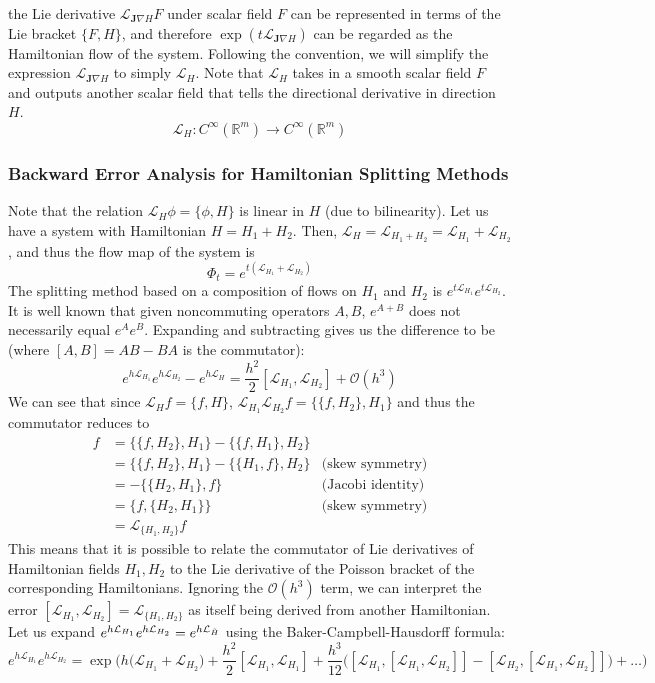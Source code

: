 \documentclass{article}
\theoremstyle{remark}
\theoremstyle{definition}
\begin{document}
the Lie derivative $\mathcal{L}_{\mathbf{J} \nabla H} F$ under scalar field $F$ can be represented in terms of the Lie bracket $\{F, H\}$, and therefore $\exp(t \mathcal{L}_{\mathbf{J} \nabla H})$ can be regarded as the Hamiltonian flow of the system. Following the convention, we will simplify the expression $\mathcal{L}_{\mathbf{J} \nabla H}$ to simply $\mathcal{L}_H$. Note that $\mathcal{L}_H$ takes in a smooth scalar field $F$ and outputs another scalar field that tells the directional derivative in direction $H$. 
\[\mathcal{L}_H: C^\infty (\mathbb{R}^m) \longrightarrow C^\infty (\mathbb{R}^m) \]

\subsubsection{Backward Error Analysis for Hamiltonian Splitting Methods}
Note that the relation $\mathcal{L}_H \phi = \{\phi, H\}$ is linear in $H$ (due to bilinearity). Let us have a system with Hamiltonian $H = H_1 + H_2$. Then, $\mathcal{L}_H = \mathcal{L}_{H_1 + H_2} = \mathcal{L}_{H_1} + \mathcal{L}_{H_2}$, and thus the flow map of the system is 
\[\Phi_t = e^{ t(\mathcal{L}_{H_1} + \mathcal{L}_{H_2})}\]
The splitting method based on a composition of flows on $H_1$ and $H_2$ is $e^{t \mathcal{L}_{H_1}} e^{t \mathcal{L}_{H_2}}$. It is well known that given noncommuting operators $A, B$, $e^{A + B}$ does not necessarily equal $e^A e^B$. Expanding and subtracting gives us the difference to be (where $[A, B] = AB - BA$ is the commutator): 
\[e^{h \mathcal{L}_{H_1}} e^{h \mathcal{L}_{H_2}} - e^{h \mathcal{L}_H} = \frac{h^2}{2} [\mathcal{L}_{H_1}, \mathcal{L}_{H_2}] + \mathcal{O}(h^3)\]
We can see that since $\mathcal{L}_{H} f = \{f, H\}$, $\mathcal{L}_{H_1} \mathcal{L}_{H_2} f = \{ \{f, H_2\}, H_1 \}$ and thus the commutator reduces to 
\begin{align*}
    [\mathcal{L}_{H_1}, \mathcal{L}_{H_2}] f & = \{ \{ f, H_2\}, H_1\} - \{ \{ f, H_1\}, H_2\} & \\
    & = \{ \{ f, H_2\}, H_1\} - \{ \{ H_1, f\}, H_2\} & \text{(skew symmetry)}\\
    & = - \{ \{H_2, H_1\}, f \} & \text{(Jacobi identity)} \\
    & = \{f, \{H_2, H_1\}\} & \text{(skew symmetry)} \\
    & = \mathcal{L}_{\{H_1, H_2\}} f 
\end{align*}
This means that it is possible to relate the commutator of Lie derivatives of Hamiltonian fields $H_1, H_2$ to the Lie derivative of the Poisson bracket of the corresponding Hamiltonians. Ignoring the $\mathcal{O}(h^3)$ term, we can interpret the error $[\mathcal{L}_{H_1}, \mathcal{L}_{H_2}] = \mathcal{L}_{\{H_1, H_2\}}$ as itself being derived from another Hamiltonian. Let us expand $e^{h \mathcal{L}_{H_1}} e^{h \mathcal{L}_{H_2}} = e^{h \mathcal{L}_{\Tilde{H}}}$ using the Baker-Campbell-Hausdorff formula: \[e^{h \mathcal{L}_{H_1}} e^{h \mathcal{L}_{H_2}} = \exp \bigg( h\big(\mathcal{L}_{H_1} + \mathcal{L}_{H_2}\big) + \frac{h^2}{2} [\mathcal{L}_{H_1}, \mathcal{L}_{H_1}] + \frac{h^3}{12} \big( [\mathcal{L}_{H_1}, [\mathcal{L}_{H_1}, \mathcal{L}_{H_2}]] - [\mathcal{L}_{H_2}, [\mathcal{L}_{H_1}, \mathcal{L}_{H_2}]] \big) + \ldots \bigg)\]
\end{document}
